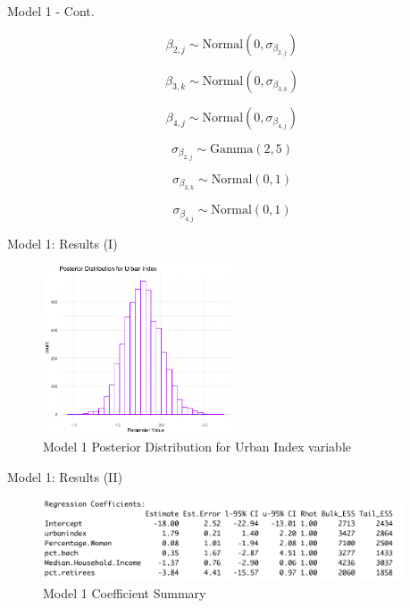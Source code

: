\documentclass{beamer}
\begin{document}
\begin{frame}{Model 1 - Cont.}

\[\beta_{2,j} \sim \text{Normal}(0, \sigma_{\beta_{2,j}})\]

\[\beta_{3,k} \sim \text{Normal}(0, \sigma_{\beta_{3,k}})\]

\[\beta_{4,j} \sim \text{Normal}(0, \sigma_{\beta_{4,j}})\]

\[\sigma_{\beta_{2,j}} \sim \text{Gamma}(2,5) \]

\[\sigma_{\beta_{3,k}} \sim \text{Normal}(0,1) \]

\[\sigma_{\beta_{4,j}} \sim \text{Normal}(0,1) \]

\end{frame}


\begin{frame}{Model 1: Results (I)}
    \begin{center}
        \begin{figure}
        \caption{Model 1 Posterior Distribution for Urban Index variable}
            \includegraphics[width=0.5\textwidth]{plots/post_urbanindex_model1.png}
        \end{figure}
    \end{center}
\end{frame}

\begin{frame}{Model 1: Results (II)}
    \begin{center}
        \begin{figure}
            \caption{Model 1 Coefficient Summary}
            \includegraphics[width=0.95\textwidth]{plots/model1_summary_output.png}
        \end{figure}
    \end{center}
\end{frame}
\end{document}
